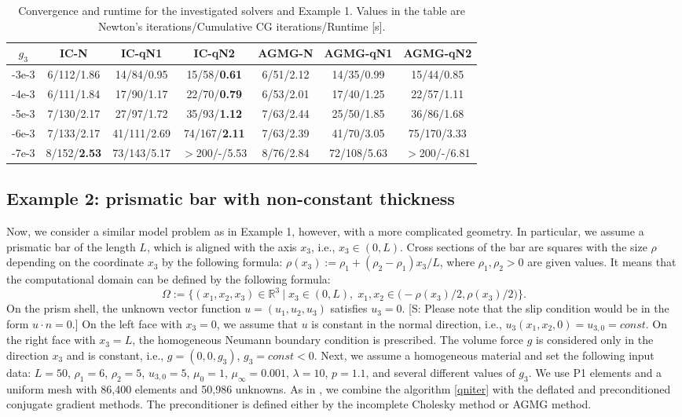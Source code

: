\documentclass[12pt]{article}
\numberwithin{equation}{section}
\begin{document}
\begin{table}[h!]
\caption{Convergence and runtime for the investigated solvers and Example 1. Values in the table are Newton's iterations/Cumulative CG iterations/Runtime [s].}
\begin{tabular}{|c||c|c|c||c|c|c|}
\hline
$g_3$ & IC-N & IC-qN1 & IC-qN2 & AGMG-N & AGMG-qN1 & AGMG-qN2 \\ \hline\hline
-3e-3 & 6/112/1.86 & 14/84/0.95 & 15/58/\textbf{0.61} & 6/51/2.12 & 14/35/0.99 & 15/44/0.85\\ \hline
-4e-3 & 6/111/1.84 & 17/90/1.17 & 22/70/\textbf{0.79} & 6/53/2.01 & 17/40/1.25 & 22/57/1.11\\ \hline
-5e-3 & 7/130/2.17 & 27/97/1.72 & 35/93/\textbf{1.12} & 7/63/2.44 & 25/50/1.85 & 36/86/1.68\\ \hline
-6e-3 & 7/133/2.17 & 41/111/2.69 & 74/167/\textbf{2.11} & 7/63/2.39 & 41/70/3.05 & 75/170/3.33\\ \hline
-7e-3 & 8/152/\textbf{2.53} & 73/143/5.17 & $>$200/-/5.53 & 8/76/2.84 & 72/108/5.63 & $>$200/-/6.81\\ \hline
\end{tabular}
\label{table_ex1}
\end{table}

\subsection{Example 2: prismatic bar with non-constant thickness}

Now, we consider a similar model problem as in Example 1, however, with a more complicated geometry. In particular, we assume a prismatic bar of the length $L$, which is aligned with the axis $x_3$, i.e., $x_3\in(0,L)$. Cross sections of the bar are squares with the size $\rho$ depending on the coordinate $x_3$ by the following formula: 
$\rho(x_3):=\rho_1+(\rho_2-\rho_1)x_3/L$, where $\rho_1, \rho_2>0$ are given values. It means that the computational domain can be defined by the following formula:
$$\Omega:=\big\{(x_1,x_2,x_3)\in\mathbb R^3\ |\; x_3\in(0,L),\; x_1,x_2\in\big(-\rho(x_3)/2,\rho(x_3)/2\big)\big\}.$$
On the prism shell, the unknown vector function $u=(u_1,u_2,u_3)$ satisfies $u_3=0$. \alert{[S: Please note that the slip condition would be in the form $u\cdot n=0$.]} On the left face with $x_3=0$, we assume that $u$ is constant in the normal direction, i.e., $u_3(x_1,x_2,0)=u_{3,0}=const$. On the right face with $x_3=L$, the homogeneous Neumann boundary condition is prescribed. The volume force $g$ is considered only in the direction $x_3$ and is constant, i.e., $g=(0,0,g_3)$, $g_3=const<0$. Next, we assume a homogeneous material and set the following input data: $L=50$, $\rho_1=6$, $\rho_2=5$, $u_{3,0}=5$, $\mu_0=1$, $\mu_\infty=0.001$, $\lambda=10$, $p=1.1$, and several different values of $g_3$. We use P1 elements and a uniform mesh with 86,400 elements and 50,986 unknowns. As in \cite{KSB25}, we combine the algorithm \eqref{qniter} with the deflated and preconditioned conjugate gradient methods. The preconditioner is defined either by the incomplete Cholesky method or AGMG method.
\end{document}
